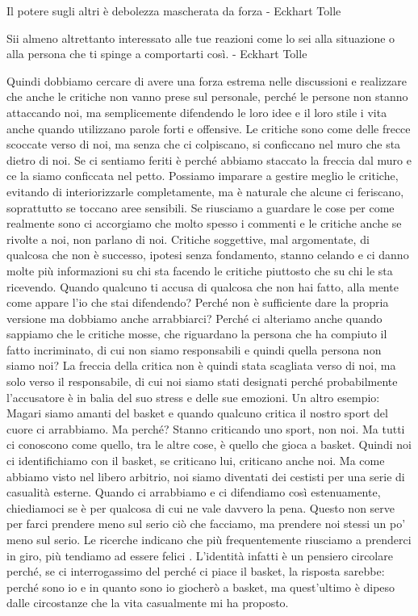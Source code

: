 \documentclass[12pt]{book} %
\begin{document}
Il potere sugli altri è debolezza mascherata da forza - Eckhart Tolle

Sii almeno altrettanto interessato alle tue reazioni come lo sei alla situazione o alla persona che ti spinge a
comportarti così. - Eckhart Tolle

Quindi dobbiamo cercare di avere una forza estrema nelle discussioni e realizzare che anche le critiche non vanno prese
sul personale, perché le persone non stanno attaccando noi, ma semplicemente difendendo le loro idee e il loro stile i
vita anche quando utilizzano parole forti e offensive. Le critiche sono come delle frecce scoccate verso di noi, ma
senza che ci colpiscano, si conficcano nel muro che sta dietro di noi. Se ci sentiamo feriti è perché abbiamo staccato
la freccia dal muro e ce la siamo conficcata nel petto. Possiamo imparare a gestire meglio le critiche, evitando di interiorizzarle completamente, ma è naturale che alcune ci feriscano, soprattutto se toccano aree sensibili. Se riusciamo a guardare le cose per come realmente sono ci
accorgiamo che molto spesso i commenti e le critiche anche se rivolte a noi, non parlano di noi. Critiche soggettive,
mal argomentate, di qualcosa che non è successo, ipotesi senza fondamento, stanno celando e ci danno molte più
informazioni su chi sta facendo le critiche piuttosto che su chi le sta ricevendo. Quando qualcuno ti accusa di
qualcosa che non hai fatto, alla mente come appare l'io che stai difendendo? Perché non è
sufficiente dare la propria versione ma dobbiamo anche arrabbiarci? Perché ci alteriamo anche quando sappiamo che le
critiche mosse, che riguardano la persona che ha compiuto il fatto incriminato, di cui non siamo responsabili e quindi
quella persona non siamo noi? La freccia della critica non è quindi stata scagliata verso di noi, ma solo verso il
responsabile, di cui noi siamo stati designati perché probabilmente l'accusatore è in balia del
suo stress e delle sue emozioni. Un altro esempio: Magari siamo amanti del basket e quando qualcuno critica il nostro
sport del cuore ci arrabbiamo. Ma perché? Stanno criticando uno sport, non noi. Ma tutti ci conoscono come quello, tra
le altre cose, è quello che gioca a basket. Quindi noi ci identifichiamo con il basket, se criticano lui, criticano
anche noi. Ma come abbiamo visto nel libero arbitrio, noi siamo diventati dei cestisti per una serie di casualità
esterne. Quando ci arrabbiamo e ci difendiamo così estenuamente, chiediamoci se è per qualcosa di cui ne vale davvero la pena. Questo non serve per farci prendere meno sul serio ciò che facciamo, ma prendere noi
stessi un po' meno sul serio. 
Le ricerche indicano che più frequentemente riusciamo a prenderci in giro, più tendiamo ad essere felici .
L'identità infatti è un pensiero circolare
perché, se ci interrogassimo del perché ci piace il basket, la risposta sarebbe: perché sono io e in quanto sono io
giocherò a basket, ma quest'ultimo è dipeso dalle circostanze che la vita casualmente mi ha
proposto.
\end{document}
